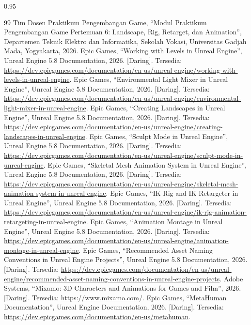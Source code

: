\documentclass[a4paper,oneside,12pt]{report}
\renewcommand{\bibname}{Daftar Pustaka}
\begin{document}
\clearpage
{}
\renewcommand{\bibname}{Daftar Pustaka}
\begin{spacing}{0.95}
	\begin{thebibliography}{99}
		\setlength{\itemsep}{0.08em}
		 Tim Dosen Praktikum Pengembangan Game, ``Modul Praktikum Pengembangan Game Pertemuan 6: Landscape, Rig, Retarget, dan Animation'', Departemen Teknik Elektro dan Informatika, Sekolah Vokasi, Universitas Gadjah Mada, Yogyakarta, 2026.
		 Epic Games, ``Working with Levels in Unreal Engine'', Unreal Engine 5.8 Documentation, 2026. [Daring]. Tersedia: \url{https://dev.epicgames.com/documentation/en-us/unreal-engine/working-with-levels-in-unreal-engine}.
		 Epic Games, ``Environmental Light Mixer in Unreal Engine'', Unreal Engine 5.8 Documentation, 2026. [Daring]. Tersedia: \url{https://dev.epicgames.com/documentation/en-us/unreal-engine/environmental-light-mixer-in-unreal-engine}.
		 Epic Games, ``Creating Landscapes in Unreal Engine'', Unreal Engine 5.8 Documentation, 2026. [Daring]. Tersedia: \url{https://dev.epicgames.com/documentation/en-us/unreal-engine/creating-landscapes-in-unreal-engine}.
		 Epic Games, ``Sculpt Mode in Unreal Engine'', Unreal Engine 5.8 Documentation, 2026. [Daring]. Tersedia: \url{https://dev.epicgames.com/documentation/en-us/unreal-engine/sculpt-mode-in-unreal-engine}.
		 Epic Games, ``Skeletal Mesh Animation System in Unreal Engine'', Unreal Engine 5.8 Documentation, 2026. [Daring]. Tersedia: \url{https://dev.epicgames.com/documentation/en-us/unreal-engine/skeletal-mesh-animation-system-in-unreal-engine}.
		 Epic Games, ``IK Rig and IK Retargeter in Unreal Engine'', Unreal Engine 5.8 Documentation, 2026. [Daring]. Tersedia: \url{https://dev.epicgames.com/documentation/en-us/unreal-engine/ik-rig-animation-retargeting-in-unreal-engine}.
		 Epic Games, ``Animation Montage in Unreal Engine'', Unreal Engine 5.8 Documentation, 2026. [Daring]. Tersedia: \url{https://dev.epicgames.com/documentation/en-us/unreal-engine/animation-montage-in-unreal-engine}.
		 Epic Games, ``Recommended Asset Naming Conventions in Unreal Engine Projects'', Unreal Engine 5.8 Documentation, 2026. [Daring]. Tersedia: \url{https://dev.epicgames.com/documentation/en-us/unreal-engine/recommended-asset-naming-conventions-in-unreal-engine-projects}.
		 Adobe Systems, ``Mixamo: 3D Characters and Animations for Games and Film'', 2026. [Daring]. Tersedia: \url{https://www.mixamo.com/}.
		 Epic Games, ``MetaHuman Documentation'', Unreal Engine Documentation, 2026. [Daring]. Tersedia: \url{https://dev.epicgames.com/documentation/en-us/metahuman}.
	\end{thebibliography}
\end{spacing}
\end{document}
